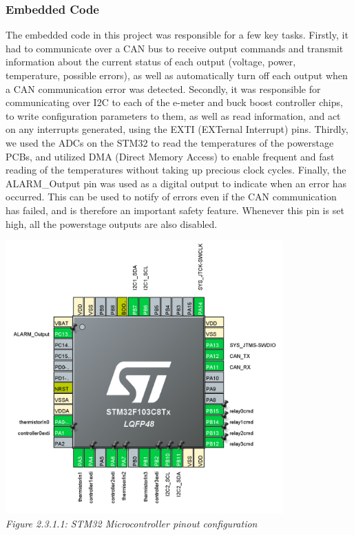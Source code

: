 \subsubsection{Embedded Code}
The embedded code in this project was responsible for a few key tasks.
Firstly, it had to communicate over a CAN bus to receive output commands and transmit information about the current status of each output (voltage, power, temperature, possible errors), as well as automatically turn off each output when a CAN communication error was detected.
Secondly, it was responsible for communicating over I2C to each of the e-meter and buck boost controller chips, to write configuration parameters to them, as well as read information, and act on any interrupts generated, using the EXTI (EXTernal Interrupt) pins.
Thirdly, we used the ADCs on the STM32 to read the temperatures of the powerstage PCBs, and utilized DMA (Direct Memory Access) to enable frequent and fast reading of the temperatures without taking up precious clock cycles.
Finally, the ALARM\_Output pin was used as a digital output to indicate when an error has occurred.
This can be used to notify of errors even if the CAN communication has failed, and is therefore an important safety feature.
Whenever this pin is set high, all the powerstage outputs are also disabled.

\begin{center}
    \includegraphics[width=0.8\textwidth]{images/stm32_ioc_pinout.png}\\
    \it Figure 2.3.1.1: STM32 Microcontroller pinout configuration\\
\end{center}

